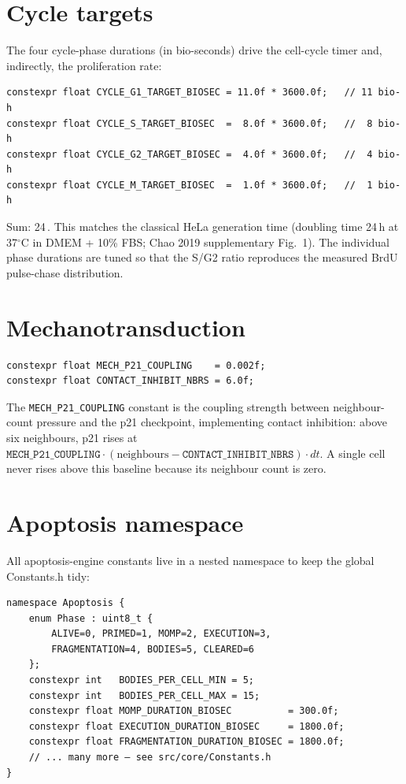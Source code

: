 \documentclass[11pt,letterpaper,twoside,openany]{book}
\newcommand{\code}[1]{\texttt{#1}}
\newcommand{\bioh}{\text{bio-h}}
\begin{document}
\section{Cycle targets}

The four cycle-phase durations (in bio-seconds) drive the cell-cycle
timer and, indirectly, the proliferation rate:
\begin{lstlisting}
constexpr float CYCLE_G1_TARGET_BIOSEC = 11.0f * 3600.0f;   // 11 bio-h
constexpr float CYCLE_S_TARGET_BIOSEC  =  8.0f * 3600.0f;   //  8 bio-h
constexpr float CYCLE_G2_TARGET_BIOSEC =  4.0f * 3600.0f;   //  4 bio-h
constexpr float CYCLE_M_TARGET_BIOSEC  =  1.0f * 3600.0f;   //  1 bio-h
\end{lstlisting}
Sum: 24\,\bioh. This matches the classical HeLa generation time
(doubling time 24\,h at 37$^\circ$C in DMEM + 10\% FBS; Chao 2019
supplementary Fig.~1). The individual phase durations are tuned so
that the S/G2 ratio reproduces the measured BrdU pulse-chase
distribution.

\section{Mechanotransduction}

\begin{lstlisting}
constexpr float MECH_P21_COUPLING    = 0.002f;
constexpr float CONTACT_INHIBIT_NBRS = 6.0f;
\end{lstlisting}
The \code{MECH\_P21\_COUPLING} constant is the coupling strength
between neighbour-count pressure and the p21 checkpoint, implementing
contact inhibition: above six neighbours, p21 rises at
$\code{MECH\_P21\_COUPLING} \cdot (\text{neighbours} -
\code{CONTACT\_INHIBIT\_NBRS})\cdot dt$. A single cell never rises
above this baseline because its neighbour count is zero.

\section{Apoptosis namespace}

All apoptosis-engine constants live in a nested namespace to keep
the global Constants.h tidy:
\begin{lstlisting}
namespace Apoptosis {
    enum Phase : uint8_t {
        ALIVE=0, PRIMED=1, MOMP=2, EXECUTION=3,
        FRAGMENTATION=4, BODIES=5, CLEARED=6
    };
    constexpr int   BODIES_PER_CELL_MIN = 5;
    constexpr int   BODIES_PER_CELL_MAX = 15;
    constexpr float MOMP_DURATION_BIOSEC          = 300.0f;
    constexpr float EXECUTION_DURATION_BIOSEC     = 1800.0f;
    constexpr float FRAGMENTATION_DURATION_BIOSEC = 1800.0f;
    // ... many more — see src/core/Constants.h
}
\end{lstlisting}
\end{document}
